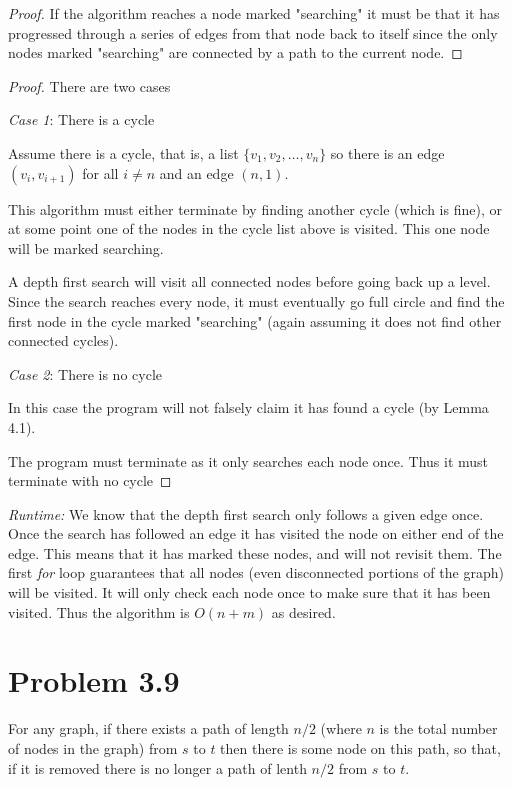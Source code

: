 \documentclass{article}
\begin{document}
\begin{proof}
If the algorithm reaches a node marked "searching" it must be that it has progressed through a series of edges from that node back to itself since the only nodes marked "searching" are connected by a path to the current node.
\end{proof}

\begin{proof} There are two cases

\emph{Case 1}: There is a cycle

Assume there is a cycle, that is, a list $\{v_1, v_2, \dots , v_n\}$ so there is an edge $(v_i, v_{i+1})$ for all $i \neq n$ and an edge $(n,1)$.

This algorithm must either terminate by finding another cycle (which is fine), or at some point one of the nodes in the cycle list above is visited. This one node will be marked searching.

A depth first search will visit all connected nodes before going back up a level. Since the search reaches every node, it must eventually go full circle and find the first node in the cycle marked "searching" (again assuming it does not find other connected cycles).

\emph{Case 2}: There is no cycle

In this case the program will not falsely claim it has found a cycle (by Lemma 4.1).

The program must terminate as it only searches each node once. Thus it must terminate with no cycle\end{proof}

\emph{Runtime:}
We know that the depth first search only follows a given edge once. Once the search has followed an edge it has visited the node on either end of the edge. This means that it has marked these nodes, and will not revisit them. The first \emph{for} loop guarantees that all nodes (even disconnected portions of the graph) will be visited. It will only check each node once to make sure that it has been visited. Thus the algorithm is $O(n+m)$ as desired.
\section{Problem 3.9}

For any graph, if there exists a path of length $n/2$ (where $n$ is the total number of nodes in the graph)  from $s$ to $t$ then there is some node on this path, so that, if it is removed there is no longer a path of lenth $n/2$ from $s$ to $t$.
\end{document}
